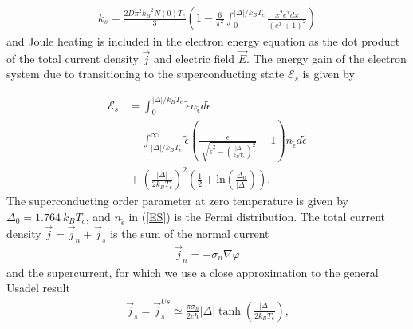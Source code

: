 \documentclass[%
reprint,
 amsmath,amssymb,
aps,
pra,
]{revtex4-1}
\begin{document}
\begin{equation}\label{Bardeen}
\begin{aligned}
k_s = \frac{2D\pi^2 {k_B}^2 N(0) T_e}{3} \left(1 - \frac{6}{\pi^2}\int_0^{\left|\Delta\right| /  k_B T_e} \frac{x^2 e^x dx}{\left(e^x + 1\right)^2 } \right)
\end{aligned}     
\end{equation}
and Joule heating is included in the electron energy equation as the dot product of the total current density 
\(\vec{j}\) and electric field \(\vec{E}\).  The energy gain of the electron system due to transitioning to the superconducting state \(\mathcal{E}_s\) is given by 

\begin{equation}\label{ES}
\begin{aligned}
\mathcal{E}_s &{}= \int_0^{\left|\Delta\right|/k_B T_e} \tilde{\epsilon} n_{\tilde{\epsilon}} d \tilde{\epsilon} \\
&{}- \int_{\left|\Delta\right| / k_B T_e}^{\infty} \tilde{\epsilon} \left(\frac{\tilde{\epsilon}}{\sqrt[]{\tilde{\epsilon}^2 - \left(\frac{\left|\Delta\right|}{k_B T_e} \right)^2}} - 1 \right) n_{\tilde{\epsilon}} d \tilde{\epsilon} \\
&{}+ \left(\frac{\left|\Delta\right|}{2 k_B T_c}\right)^2 \left(\frac{1}{2} + \text{ln}\left(\frac{\Delta_0}{\left|\Delta\right|}\right)\right).
\end{aligned}     
\end{equation}
The superconducting order parameter at zero temperature is given by 
\(\Delta_0 = 1.764\: k_B T_c \), and \(n_{\tilde{\epsilon}}\) in (\ref{ES}) is the Fermi distribution.  The total current density \(\vec{j} = \vec{j}_n + \vec{j}_s\) is the sum of the normal current
\begin{equation}\label{normal j}
\begin{aligned}
\vec{j}_n = -\sigma_n \nabla \varphi
\end{aligned}     
\end{equation}
and the supercurrent, for which we use a close approximation to the general Usadel result
\begin{equation}\label{Usadel j}
\begin{aligned}
\vec{j}_s = \vec{j}_s^{Us} \simeq \frac{\pi \sigma_n}{2 e \hbar}\left|\Delta\right|\tanh\left(\frac{\left|\Delta\right|}{2 k_B T_e}\right) \text{,}
\end{aligned}     
\end{equation}
\end{document}
